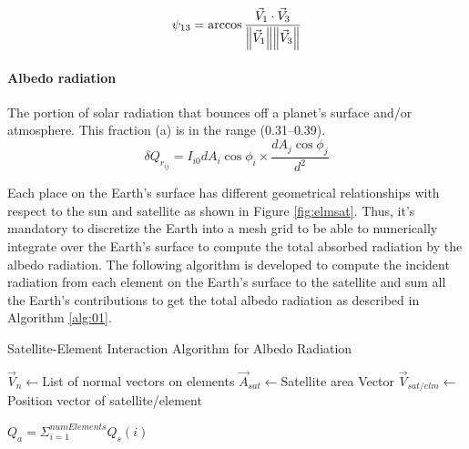 \documentclass[11pt]{article}
\begin{document}



\begin{equation}\label{eq:psi13}
    \psi_{13} = \arccos{\frac{\vec{V}_1\cdot \vec{V}_3}{\norm{\vec{V}_1}\norm{\vec{V}_3}}}
\end{equation}

\paragraph{Albedo radiation} 
The portion of solar radiation that bounces off a planet's surface and/or atmosphere. This fraction (a) is in the range (0.31–0.39).
\begin{equation}
    \delta Q_{r_{ij}} = I_{i0} dA_i\cos{\phi_i}\times\frac{dA_j \cos{\phi_j}}{d^2}
\end{equation}

Each place on the Earth's surface has different geometrical relationships with respect to the sun and satellite as shown in Figure \ref{fig:elmsat}. Thus, it's mandatory to discretize the Earth into a mesh grid to be able to numerically integrate over the Earth's surface to compute the total absorbed radiation by the albedo radiation. The following algorithm is developed to compute the incident radiation from each element on the Earth's surface to the satellite and sum all the Earth's contributions to get the total albedo radiation as described in Algorithm \ref{alg:01}.




{}

\begin{algorithm}[hbt!]
\caption{Satellite-Element Interaction Algorithm for Albedo Radiation}\label{alg:two}
\label{alg:01}
$\vec{V}_{n} \gets $List of normal vectors on elements\;
$\vec{A}_{sat} \gets $Satellite area Vector\;
$\vec{V}_{sat/elm} \gets$ Position vector of satellite/element\;

        
    $Q_a = \Sigma_{i=1}^{numElements}{Q_s(i)}  $
\end{algorithm}
\end{document}
